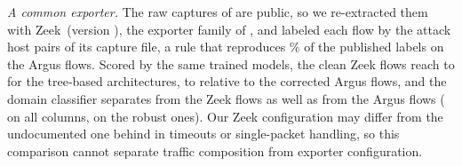 \emph{A common exporter.} The raw captures of \DB{} are public, so we re-extracted them with Zeek~(version \ZkVersion{}), the exporter family of \DA{}, and labeled each flow by the attack host pairs of its capture file, a rule that reproduces \ZkRuleAgreePct\% of the published labels on the Argus flows. Scored by the same trained models, the clean Zeek flows reach \RZkTreeCleanBAmin{} to \RZkTreeCleanBAmax{} for the tree-based architectures, \RZkTreeCleanDiffMin{} to \RZkTreeCleanDiffMax{} relative to the corrected Argus flows, and the domain classifier separates \DA{} from the Zeek flows as well as from the Argus flows (\RDomZkShared{} on all columns, \RDomZkRobust{} on the robust ones). Our Zeek configuration may differ from the undocumented one behind \DA{} in timeouts or single-packet handling, so this comparison cannot separate traffic composition from exporter configuration.


